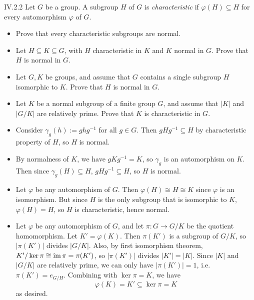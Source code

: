 \begin{problem}{IV.2.2}
Let $G$ be a group. A subgroup $H$ of $G$ is \emph{characteristic} if $\varphi(H) \subseteq H$ for every automorphism $\varphi$ of $G$.
\begin{itemize}
\setlength\itemsep{0pc}
\item Prove that every characteristic subgroups are normal.
\item Let $H \subseteq K \subseteq G$, with $H$ characteristic in $K$ and $K$ normal in $G$. Prove that $H$ is normal in $G$. 
\item Let $G,K$ be groups, and assume that $G$ contains a single subgroup $H$ isomorphic to $K$. Prove that $H$ is normal in $G$.
\item Let $K$ be a normal subgroup of a finite group $G$, and assume that $|K|$ and $|G/K|$ are relatively prime. Prove that $K$ is characteristic in $G$.
\end{itemize} 
\end{problem}
\begin{pf}
\begin{itemize}
\setlength\itemsep{0pt}
\item Consider $\gamma_g(h) := ghg^{-1}$ for all $g \in G$. Then $gHg^{-1} \subseteq H$ by characteristic property of $H$, so $H$ is normal.
\item By normalness of $K$, we have $gKg^{-1} = K$, so $\gamma_g$ is an automorphism on $K$. Then since $\gamma_g(H) \subseteq H$, $gHg^{-1} \subseteq H$, so $H$ is normal.
\item Let $\varphi$ be any automorphism of $G$. Then $\varphi(H) \cong H \cong K$ since $\varphi$ is an isomorphism. But since $H$ is the only subgroup that is isomorphic to $K$, $\varphi(H) = H$, so $H$ is characteristic, hence normal. 
\item Let $\varphi$ be any automorphism of $G$, and let $\pi : G \to G/K$ be the quotient homomorphism.	Let $K' = \varphi(K)$. Then $\pi(K')$ is a subgroup of $G/K$, so $|\pi(K')|$ divides $|G/K|$. Also, by first isomorphism theorem, $K'/\ker \pi \cong \operatorname{im} \pi = \pi(K')$, so $|\pi(K')|$ divides $|K'| = |K|$. Since $|K|$ and $|G/K|$ are relatively prime, we can only have $|\pi(K')| = 1$, i.e. $\pi(K') = e_{G/H}$. Combining with $\ker \pi = K$, we have
\[
\varphi(K) = K' \subseteq \ker \pi = K
\]
as desired.
\end{itemize}
\end{pf}

